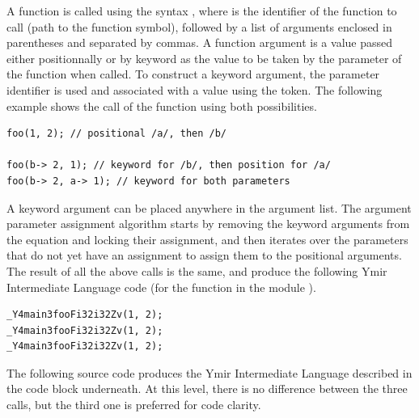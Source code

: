 A function is called using the syntax , where
 is the identifier of the function to call (path to the function
symbol), followed by a list of arguments enclosed in parentheses and separated
by commas. A function argument is a value passed either positionnally or by
keyword as the value to be taken by the parameter of the function when called.
To construct a keyword argument, the parameter identifier is used and associated
with a value using the \token{->} token. The following example shows the call
of the function  using both possibilities.

\begin{lstlisting}[style=coloredverbatim]
foo(1, 2); // positional /a/, then /b/

foo(b-> 2, 1); // keyword for /b/, then position for /a/
foo(b-> 2, a-> 1); // keyword for both parameters
\end{lstlisting}

A keyword argument can be placed anywhere in the argument list. The argument
parameter assignment algorithm starts by removing the keyword arguments from the
equation and locking their assignment, and then iterates over the parameters
that do not yet have an assignment to assign them to the positional arguments.
The result of all the above calls is the same, and produce the following Ymir
Intermediate Language code (for the function  in the module
).

\begin{lstlisting}[style=lyilVerb]
_Y4main3fooFi32i32Zv(1, 2);
_Y4main3fooFi32i32Zv(1, 2);
_Y4main3fooFi32i32Zv(1, 2);
\end{lstlisting}


The following source code produces the Ymir Intermediate Language described in
the code block underneath. At this level, there is no difference between the
three calls, but the third one is preferred for code clarity.

